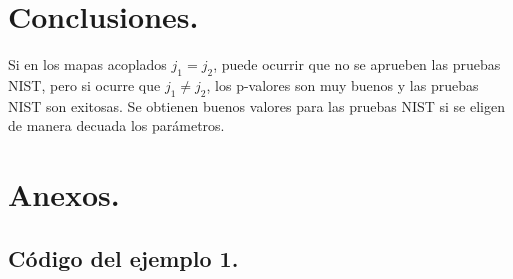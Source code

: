 \documentclass[12pt,3p]{elsarticle}
\begin{document}
\section{Conclusiones.}
Si en los mapas acoplados $j_{1}= j_{2}$, puede ocurrir que no se aprueben las pruebas NIST, pero si ocurre que  $j_{1} \neq j_{2}$, los p-valores son muy buenos y las pruebas NIST son exitosas. Se obtienen buenos valores para las pruebas NIST si se eligen de manera decuada los parámetros.
\section{Anexos.}

\subsection{Código del ejemplo 1.}
\end{document}
